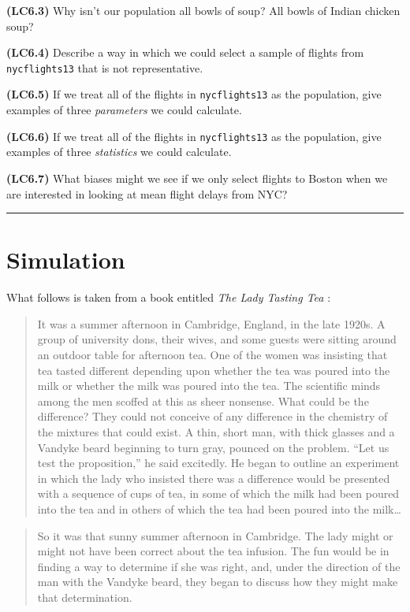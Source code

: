 \documentclass[]{tufte-book}
\begin{document}
\textbf{(LC6.3)} Why isn't our population all bowls of soup? All bowls
of Indian chicken soup?

\textbf{(LC6.4)} Describe a way in which we could select a sample of
flights from \texttt{nycflights13} that is not representative.

\textbf{(LC6.5)} If we treat all of the flights in \texttt{nycflights13}
as the population, give examples of three \emph{parameters} we could
calculate.

\textbf{(LC6.6)} If we treat all of the flights in \texttt{nycflights13}
as the population, give examples of three \emph{statistics} we could
calculate.

\textbf{(LC6.7)} What biases might we see if we only select flights to
Boston when we are interested in looking at mean flight delays from NYC?

\begin{center}\rule{\linewidth}{\linethickness}\end{center}

\section{Simulation}\label{simulation}

What follows is taken from a book entitled \emph{The Lady Tasting Tea}
\citep{salsburg2001}:

\begin{quote}
It was a summer afternoon in Cambridge, England, in the late 1920s. A
group of university dons, their wives, and some guests were sitting
around an outdoor table for afternoon tea. One of the women was
insisting that tea tasted different depending upon whether the tea was
poured into the milk or whether the milk was poured into the tea. The
scientific minds among the men scoffed at this as sheer nonsense. What
could be the difference? They could not conceive of any difference in
the chemistry of the mixtures that could exist. A thin, short man, with
thick glasses and a Vandyke beard beginning to turn gray, pounced on the
problem. ``Let us test the proposition,'' he said excitedly. He began to
outline an experiment in which the lady who insisted there was a
difference would be presented with a sequence of cups of tea, in some of
which the milk had been poured into the tea and in others of which the
tea had been poured into the milk\ldots{}
\end{quote}

\begin{quote}
So it was that sunny summer afternoon in Cambridge. The lady might or
might not have been correct about the tea infusion. The fun would be in
finding a way to determine if she was right, and, under the direction of
the man with the Vandyke beard, they began to discuss how they might
make that determination.
\end{quote}
\end{document}
